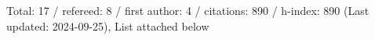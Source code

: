 Total: 17 / refereed: 8 / first author: 4 / citations: 890 / h-index: 890 (Last updated: 2024-09-25), List attached below